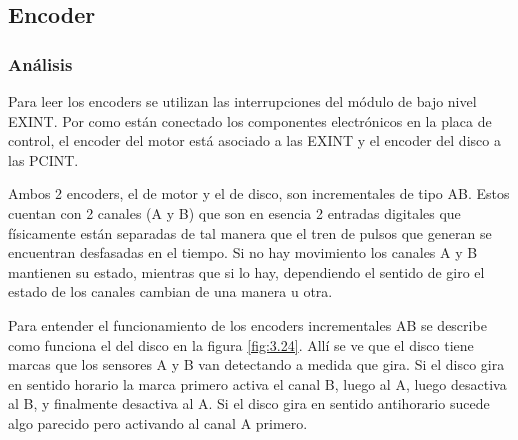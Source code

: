 \subsection{Encoder}
\subsubsection{Análisis}
Para leer los encoders se utilizan las interrupciones del módulo de bajo nivel EXINT. Por como están conectado los componentes electrónicos en la placa de control, el encoder del motor está asociado a las EXINT y el encoder del disco a las PCINT.

Ambos 2 encoders, el de motor y el de disco, son incrementales de tipo AB. Estos cuentan con 2 canales (A y B) que son en esencia 2 entradas digitales que físicamente están separadas de tal manera que el tren de pulsos que generan se encuentran desfasadas en el tiempo. Si no hay movimiento los canales A y B mantienen su estado, mientras que si lo hay, dependiendo el sentido de giro el estado de los canales cambian de una manera u otra.

Para entender el funcionamiento de los encoders incrementales AB se describe como funciona el del disco en la figura \ref{fig:3.24}. Allí se ve que el disco tiene marcas que los sensores A y B van detectando a medida que gira. Si el disco gira en sentido horario la marca primero activa el canal B, luego al A, luego desactiva al B, y finalmente desactiva al A. Si el disco gira en sentido antihorario sucede algo parecido pero activando al canal A primero.


